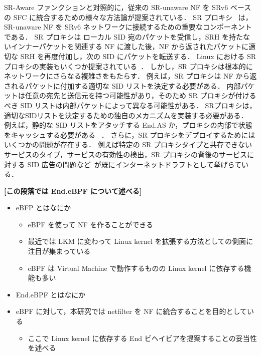 SR-Aware ファンクションと対照的に，従来の SR-unaware NF を SRv6 ベースの SFC に統合するための様々な方法論が提案されている．
SR プロキシ~\cite{ietf-spring-sr-service-programming-08} は，SR-unaware NF を SRv6 ネットワークに接続するための重要なコンポーネントである．
SR プロキシは ローカル SID 宛のパケットを受信し，SRH を持たないインナーパケットを関連する NF に渡した後，NF から返されたパケットに適切な SRH を再度付加し，次の SID にパケットを転送する．
Linux における SR プロキシの実装もいくつか提案されている~\cite{sfc-proxy-bpf,sfc-with-leg-vnf,afxdp-for-srv6}．
しかし，SR プロキシは根本的にネットワークにさらなる複雑さをもたらす．
例えば，SR プロキシは NF から返されるパケットに付加する適切な SID リストを決定する必要がある．
内部パケットは任意の宛先と送信元を持つ可能性があり，そのため SR プロキシが付けるべき SID リストは内部パケットによって異なる可能性がある．
SRプロキシは，適切なSIDリストを決定するための独自のメカニズムを実装する必要がある．
例えば，静的な SID リストをアタッチする End.AS か，プロキシの内部で状態をキャッシュする必要がある~\cite{sfc-proxy-bpf} ．
さらに，SR プロキシをデプロイするためにはいくつかの問題が存在する．
例えば特定の SR プロキシタイプと共存できないサービスのタイプ，サービスの有効性の検出，SR プロキシの背後のサービスに対する SID 広告の問題など~\cite{draft-scexp}が既にインターネットドラフトとして挙げらている．


\textbf{[この段落では End.eBPF について述べる]}
\begin{itemize}
    \item eBFP とはなにか
    \begin{itemize}
        \item eBPF を使って NF を作ることができる 
        \item 最近では LKM に変わって Linux kernel を拡張する方法としての側面に注目が集まっている
        \item eBPF は Virtual Machine で動作するものの Linux kernel に依存する機能も多い
    \end{itemize}
    \item End.eBPF とはなにか
    \item eBPF に対して，本研究では netfilter を NF に統合することを目的としている
    \begin{itemize}
        \item ここで Linux kernel に依存する End ビヘイビアを提案することの妥当性を述べる
    \end{itemize}
\end{itemize}

